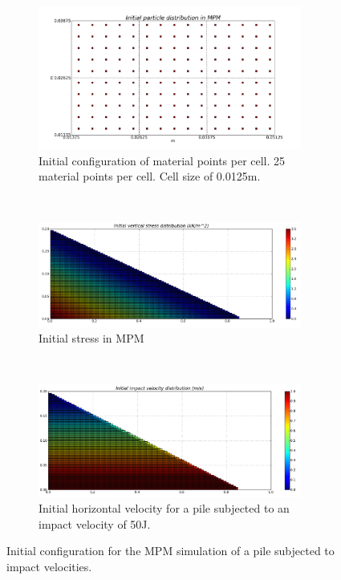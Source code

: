 \begin{figure}[tbhp]
\centering
\begin{subfigure}[t]{0.75\textwidth}
\centering
\includegraphics[width=0.95\textwidth]{MPM_Initial_PIC_Slope}
\caption{Initial configuration of material points per cell. 25 material points 
per cell. Cell size of 0.0125m.}
\label{fig:MPM_Initial_PIC_Slope}
\end{subfigure} \\
%
\begin{subfigure}[t]{0.95\textwidth}
\centering
\includegraphics[width=0.95\textwidth]{MPM_Stress_Slope}
\caption{Initial stress in MPM}
\label{fig:MPM_Stress_Slope}
\end{subfigure} \\
%
\begin{subfigure}[t]{0.95\textwidth}
\centering
\includegraphics[width=0.95\textwidth]{MPM_Velocity_Slope}
\caption{Initial horizontal velocity for a pile subjected to an impact velocity 
of 50J.}
\label{fig:MPM_Velocity_Slope}
\end{subfigure}
\caption{Initial configuration for the MPM simulation of a pile subjected to 
impact velocities.}
\label{fig:MPM_Slope_setup}
\end{figure}



